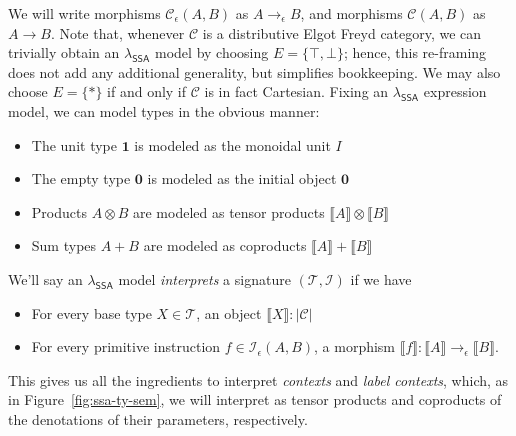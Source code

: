 \documentclass[acmsmall,screen,review]{acmart}
\newcommand{\mc}[1]{\ensuremath{\mathcal{#1}}}
\newcommand{\mb}[1]{\ensuremath{\mathbf{#1}}}
\newcommand{\ms}[1]{\ensuremath{\mathsf{#1}}}
\newcommand{\dnt}[1]{\llbracket{#1}\rrbracket}
\newcommand{\isotopessa}{\(\lambda_{\ms{SSA}}\)}
\begin{document}
We will write morphisms $\mc{C}_\epsilon(A, B)$ as $A \to_\epsilon B$, and morphisms $\mc{C}(A, B)$
as $A \to B$. Note that, whenever $\mc{C}$ is a distributive Elgot Freyd category, we can trivially
obtain an \isotopessa{} model by choosing $E = \{\top, \bot\}$; hence, this re-framing does not add
any additional generality, but simplifies bookkeeping. We may also choose $E = \{*\}$ if and only if
$\mc{C}$ is in fact Cartesian.
%
Fixing an \isotopessa{} expression model, we can model types in the obvious manner: 
\begin{itemize}
  \item The unit type $\mb{1}$ is modeled as the monoidal unit $I$
  \item The empty type $\mb{0}$ is modeled as the initial object $\mb{0}$
  \item Products $A \otimes B$ are modeled as tensor products $\dnt{A} \otimes \dnt{B}$
  \item Sum types $A + B$ are modeled as coproducts $\dnt{A} + \dnt{B}$
\end{itemize}
We'll say an \isotopessa{} model \emph{interprets} a signature $(\mc{T}, \mc{I})$ if we have
\begin{itemize}
  \item For every base type $X \in \mc{T}$, an object $\dnt{X} : |\mc{C}|$
  \item For every primitive instruction $f \in \mc{I}_\epsilon(A, B)$, a morphism $\dnt{f} : \dnt{A}
  \to_\epsilon \dnt{B}$.
\end{itemize}
This gives us all the ingredients to interpret \emph{contexts} and \emph{label contexts}, which, as
in Figure~\ref{fig:ssa-ty-sem}, we will interpret as tensor products and coproducts of the
denotations of their parameters, respectively.
\end{document}

